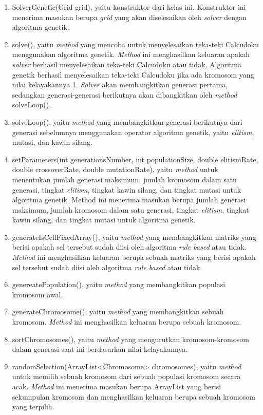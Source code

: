 \begin{enumerate}
\item SolverGenetic(Grid grid), yaitu konstruktor dari kelas ini. Konstruktor ini menerima masukan berupa \textit{grid} yang akan diselesaikan oleh \textit{solver} dengan algoritma genetik.
\item solve(), yaitu \textit{method} yang mencoba untuk menyelesaikan teka-teki Calcudoku menggunakan algoritma genetik. \textit{Method} ini menghasilkan keluaran apakah \textit{solver} berhasil menyelesaikan teka-teki Calcudoku atau tidak. Algoritma genetik berhasil menyelesaikan teka-teki Calcudoku jika ada kromosom yang nilai kelayakannya 1. \textit{Solver} akan membangkitkan generasi pertama, sedangkan generasi-generasi berikutnya akan dibangkitkan oleh \textit{method} solveLoop().
\item solveLoop(), yaitu \textit{method} yang membangkitkan generasi berikutnya dari generasi sebelumnya menggunakan operator algoritma genetik, yaitu \textit{elitism}, mutasi, dan kawin silang.
\item setParameters(int generationsNumber, int populationSize, double elitismRate, double crossoverRate, double mutationRate), yaitu \textit{method} untuk menentukan jumlah generasi maksimum, jumlah kromosom dalam satu generasi, tingkat \textit{elitism}, tingkat kawin silang, dan tingkat mutasi untuk algoritma genetik. Method ini menerima masukan berupa jumlah generasi maksimum, jumlah kromosom dalam satu generasi, tingkat \textit{elitism}, tingkat kawin silang, dan tingkat mutasi untuk algoritma genetik.
\item generateIsCellFixedArray(), yaitu \textit{method} yang membangkitkan matriks yang berisi apakah sel tersebut sudah diisi oleh algoritma \textit{rule based} atau tidak. \textit{Method} ini menghasilkan keluaran berupa sebuah matriks yang berisi apakah sel tersebut sudah diisi oleh algoritma \textit{rule based} atau tidak.
\item genereatePopulation(), yaitu \textit{method} yang membangkitkan populasi kromosom awal.
\item generateChromosome(), yaitu \textit{method} yang membangkitkan sebuah kromosom. \textit{Method} ini menghasilkan keluaran berupa sebuah kromosom.
\item sortChromosomes(), yaitu \textit{method} yang mengurutkan kromosom-kromosom dalam generasi saat ini berdasarkan nilai kelayakannya.
\item randomSelection(ArrayList<Chromosome> chromosomes), yaitu \textit{method} untuk memilih sebuah kromosom dari sebuah populasi kromosom secara acak. \textit{Method} ini menerima masukan berupa ArrayList yang berisi sekumpulan kromosom dan menghasilkan keluaran berupa sebuah kromosom yang terpilih.

\end{enumerate}
